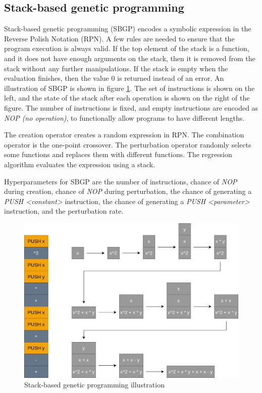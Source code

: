 \subsection{Stack-based genetic programming}

Stack-based genetic programming (SBGP) \citep{sbgp} encodes a symbolic expression in the Reverse Polish Notation (RPN). A few rules are needed to ensure that the program execution is always valid. If the top element of the stack is a function, and it does not have enough arguments on the stack, then it is removed from the stack without any further manipulations. If the stack is empty when the evaluation finishes, then the value $0$ is returned instead of an error. An illustration of SBGP is shown in figure \ref{fig:sbgp}. The set of instructions is shown on the left, and the state of the stack after each operation is shown on the right of the figure. The number of instructions is fixed, and empty instructions are encoded as \textit{NOP (no operation)}, to functionally allow programs to have different lengths.

The creation operator creates a random expression in RPN. The combination operator is the one-point crossover. The perturbation operator randomly selects some functions and replaces them with different functions. The regression algorithm evaluates the expression using a stack.

Hyperparameters for SBGP are the number of instructions, chance of \textit{NOP} during creation, chance of \textit{NOP} during perturbation, the chance of generating a \textit{PUSH <constant>} instruction, the chance of generating a \textit{PUSH <parameter>} instruction, and the perturbation rate.

\begin{figure}[!htbp]
	\centering
	\includegraphics[scale=0.28]{../images/sbgp.png}
	\caption{Stack-based genetic programming illustration}
    \label{fig:sbgp}
\end{figure}

